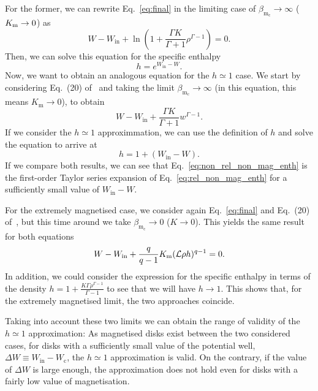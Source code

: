\documentclass[twocolumn,aps,showpacs,showkeys,prd,superscriptaddress,byrevtex, amsmath]{revtex4-1}
\begin{document}
For the former, we can rewrite Eq.~\eqref{eq:final} in the limiting case of $\beta_{\mathrm{m_c}} \rightarrow \infty$ ($K_{\rm m} \rightarrow 0$) as
\begin{equation}
W - W_{\mathrm{in}} + \ln \left(1 + \frac{\Gamma K}{\Gamma +1}\rho^{\Gamma -1}\right) = 0.
\end{equation}
Then, we can solve this equation for the specific enthalpy
\begin{equation}\label{eq:rel_non_mag_enth}
h = e^{W_{\mathrm{in}} - W}.
\end{equation}
Now, we want to obtain an analogous equation for the $h \simeq 1$ case. We start by considering Eq.~(20) of~\cite{Gimeno-Soler:2017} and taking the limit $\beta_{\mathrm{m_c}} \rightarrow \infty$ (in this equation, this means $K_{\mathrm{m}} \rightarrow 0$), to obtain
\begin{equation}
W - W_{\mathrm{in}} + \frac{\Gamma K}{\Gamma +1}w^{\Gamma -1}.
\end{equation}
If we consider the $h \simeq 1$ approximmation, we can use the definition of $h$ and solve the equation to arrive at
\begin{equation}\label{eq:non_rel_non_mag_enth}
h = 1 + (W_{\mathrm{in}} - W).
\end{equation}
If we compare both results, we can see that Eq.~\eqref{eq:non_rel_non_mag_enth} is the first-order Taylor series expansion of Eq.~\eqref{eq:rel_non_mag_enth} for a sufficiently small value of $W_{\mathrm{in}} - W$.

For the extremely magnetised case, we consider again Eq.~\eqref{eq:final} and Eq.~(20) of~\cite{Gimeno-Soler:2017}, but this time around we take $\beta_{\mathrm{m_c}} \rightarrow 0$ ($K \rightarrow 0$). This yields the same result for both equations
\begin{equation}
W - W_{\mathrm{in}} + \frac{q}{q-1}K_{\rm m}(\mathcal{L}\rho h)^{q-1}=0.
\end{equation}
In addition, we could consider the expression for the specific enthalpy in terms of the density $h = 1 + \frac{K\Gamma\rho^{\Gamma-1}}{\Gamma - 1}$ to 
see that we will have $h \rightarrow 1$. This shows that, for the extremely magnetised limit, the two approaches coincide.

Taking into account these two limits we can obtain the range of validity of the $h \simeq 1$ approximation: As magnetised disks exist between the two considered cases, for disks with a sufficiently small value of the potential well, $\Delta W \equiv W_{\mathrm{in}} - W_{\mathrm{c}}$, the $h \simeq 1$ approximation is valid. On the contrary, if the value of $\Delta W$ is large enough, the approximation does not hold even for disks with a fairly low value of magnetisation.
\end{document}
